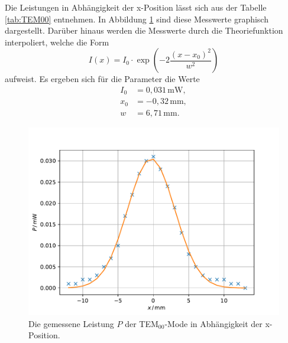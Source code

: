 Die Leistungen in Abhängigkeit der x-Position lässt sich aus der Tabelle \ref{tab:TEM00} entnehmen.
In Abbildung \ref{fig:TEM00} sind diese Messwerte graphisch dargestellt. Darüber hinaus werden die Messwerte durch 
die Theoriefunktion interpoliert, welche die Form
\begin{equation}
    I(x)=I_0\cdot \exp\left(-2\frac{(x-x_0)^2}{w^2}\right)
\end{equation}
aufweist.
Es ergeben sich für die Parameter die Werte
\begin{align*}
    I_0&=0,031\,\text{mW}{,}\\
    x_0&=-0,32\,\text{mm}{,}\\
    w&=6,71\,\text{mm}.
\end{align*}
\begin{figure}
    \center
    \includegraphics[width=\textwidth]{plots/TEM00.pdf}
    \caption{Die gemessene Leistung $P$ der TEM$_{00}$-Mode in Abhängigkeit der x-Position.}
    \label{fig:TEM00}
\end{figure}


